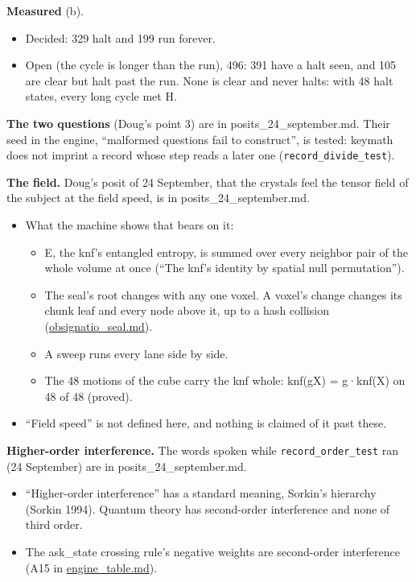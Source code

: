 \textbf{Measured} (b).

\begin{itemize}
\item Decided: 329 halt and 199 run forever.
\item Open (the cycle is longer than the run), 496: 391 have a halt seen, and 105 are clear but halt past the run. None is clear and never halts: with 48 halt states, every long cycle met H.
\end{itemize}

\textbf{The two questions} (Doug's point 3) are in posits\_\allowbreak{}24\_\allowbreak{}september.md. Their seed in the engine, “malformed questions fail to construct”, is tested: keymath does not imprint a record whose step reads a later one (\texttt{record\_\allowbreak{}divide\_\allowbreak{}test}).

\textbf{The field.} Doug's posit of 24 September, that the crystals feel the tensor field of the subject at the field speed, is in posits\_\allowbreak{}24\_\allowbreak{}september.md.

\begin{itemize}
\item What the machine shows that bears on it:

\begin{itemize}
\item E, the knf's entangled entropy, is summed over every neighbor pair of the whole volume at once (“The knf's identity by spatial null permutation”).
\item The seal's root changes with any one voxel. A voxel's change changes its chunk leaf and every node above it, up to a hash collision (\hyperref[chap:obsignatio-seal]{obsignatio\_\allowbreak{}seal.md}).
\item A sweep runs every lane side by side.
\item The 48 motions of the cube carry the knf whole: knf(gX) = g·knf(X) on 48 of 48 (proved).
\end{itemize}
\item “Field speed” is not defined here, and nothing is claimed of it past these.
\end{itemize}

\textbf{Higher-order interference.} The words spoken while \texttt{record\_\allowbreak{}order\_\allowbreak{}test} ran (24 September) are in posits\_\allowbreak{}24\_\allowbreak{}september.md.

\begin{itemize}
\item “Higher-order interference” has a standard meaning, Sorkin's hierarchy (Sorkin 1994). Quantum theory has second-order interference and none of third order.
\item The ask\_\allowbreak{}state crossing rule's negative weights are second-order interference (A15 in \hyperref[chap:engine-table]{engine\_\allowbreak{}table.md}).
\end{itemize}

